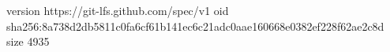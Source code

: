 version https://git-lfs.github.com/spec/v1
oid sha256:8a738d2db5811c0fa6cf61b141ec6c21adc0aae160668e0382ef228f62ae2c8d
size 4935
